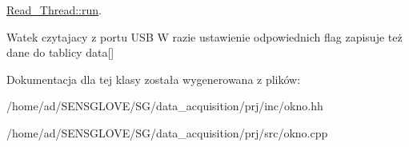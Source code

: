 \hyperlink{class_read___thread_a261a3cc9c3dc6abe61946123c3de76dc}{Read\+\_\+\+Thread\+::run}. 

Watek czytajacy z portu U\+SB W razie ustawienie odpowiednich flag zapisuje też dane do tablicy data\mbox{[}\mbox{]} 

Dokumentacja dla tej klasy została wygenerowana z plików\+:\begin{DoxyCompactItemize}
\item 
/home/ad/\+S\+E\+N\+S\+G\+L\+O\+V\+E/\+S\+G/data\+\_\+acquisition/prj/inc/okno.\+hh\item 
/home/ad/\+S\+E\+N\+S\+G\+L\+O\+V\+E/\+S\+G/data\+\_\+acquisition/prj/src/okno.\+cpp\end{DoxyCompactItemize}
